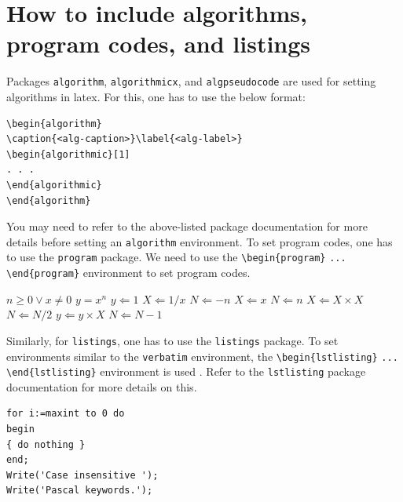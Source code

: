 \section{How to include algorithms, program codes, and listings}\label{sec8}
Packages \verb+algorithm+, \verb+algorithmicx+, and \verb+algpseudocode+ are used for setting algorithms in latex.
For this, one has to use the below format:

\begin{verbatim}
\begin{algorithm}
\caption{<alg-caption>}\label{<alg-label>}
\begin{algorithmic}[1]
. . .
\end{algorithmic}
\end{algorithm}
\end{verbatim}

You may need to refer to the above-listed package documentation for more details before setting an \verb+algorithm+ environment.
To set program codes, one has to use the \verb+program+ package. We need to use the \verb+\begin{program}+ \verb+...+
\verb+\end{program}+ environment to set program codes.

\begin{algorithm}[!ht]
\caption{Calculate $y = x^n$}\label{algo1}
\begin{algorithmic}[1]
\Require $n \geq 0 \vee x \neq 0$
\Ensure $y = x^n$
\State $y \Leftarrow 1$
        \State $X \Leftarrow 1 / x$
        \State $N \Leftarrow -n$
\Else
        \State $X \Leftarrow x$
        \State $N \Leftarrow n$
\EndIf
{}
            \State $X \Leftarrow X \times X$
            \State $N \Leftarrow N / 2$
        \Else[$N$ is odd]
            \State $y \Leftarrow y \times X$
            \State $N \Leftarrow N - 1$
        \EndIf
\EndWhile
\end{algorithmic}
\end{algorithm}

Similarly, for \verb+listings+, one has to use the \verb+listings+ package. To set environments similar to the \verb+verbatim+ environment, the \verb+\begin{lstlisting}+ \verb+... + \verb+\end{lstlisting}+ environment is used . Refer to the \verb+lstlisting+ package documentation for more details on this.

\begin{minipage}{\hsize}%
\lstset{language=Pascal}%
\begin{lstlisting}[frame=single,framexleftmargin=-1pt,framexrightmargin=-17pt,framesep=12pt,linewidth=0.95\textwidth]
for i:=maxint to 0 do
begin
{ do nothing }
end;
Write('Case insensitive ');
Write('Pascal keywords.');
\end{lstlisting}
\end{minipage}


